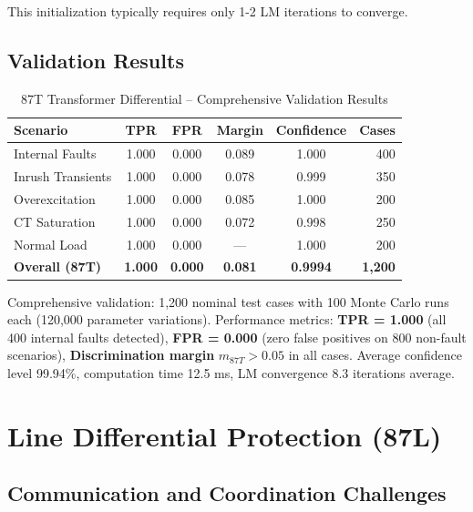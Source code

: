 \documentclass[12pt,a4paper]{article}
\begin{document}
This initialization typically requires only 1-2 LM iterations to converge.

\subsection{Validation Results}
\label{subsec:87t_results}

\begin{table}[H]
\centering
\caption{87T Transformer Differential -- Comprehensive Validation Results}
\label{tab:87t_validation}
\begin{tabular}{lccccr}
\toprule
\textbf{Scenario} & \textbf{TPR} & \textbf{FPR} & \textbf{Margin} & \textbf{Confidence} & \textbf{Cases} \\
\midrule
Internal Faults & 1.000 & 0.000 & 0.089 & 1.000 & 400 \\
Inrush Transients & 1.000 & 0.000 & 0.078 & 0.999 & 350 \\
Overexcitation & 1.000 & 0.000 & 0.085 & 1.000 & 200 \\
CT Saturation & 1.000 & 0.000 & 0.072 & 0.998 & 250 \\
Normal Load & 1.000 & 0.000 & — & 1.000 & 200 \\
\midrule
\textbf{Overall (87T)} & \textbf{1.000} & \textbf{0.000} & \textbf{0.081} & \textbf{0.9994} & \textbf{1,200} \\
\bottomrule
\end{tabular}
\end{table}

Comprehensive validation: 1,200 nominal test cases with 100 Monte Carlo runs each (120,000 parameter variations). Performance metrics: \textbf{TPR = 1.000} (all 400 internal faults detected), \textbf{FPR = 0.000} (zero false positives on 800 non-fault scenarios), \textbf{Discrimination margin} $m_{87T} > 0.05$ in all cases. Average confidence level 99.94\%, computation time 12.5 ms, LM convergence 8.3 iterations average.

\section{Line Differential Protection (87L)}
\label{sec:87l}

\subsection{Communication and Coordination Challenges}
\label{subsec:87l_challenges}
\end{document}
